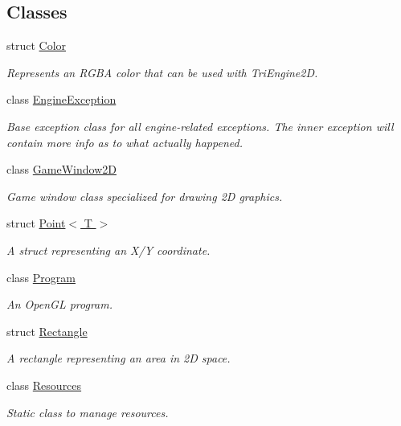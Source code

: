 \subsection*{Classes}
\begin{DoxyCompactItemize}
\item 
struct \hyperlink{struct_tri_devs_1_1_tri_engine_1_1_color}{Color}
\begin{DoxyCompactList}\small\item\em Represents an R\-G\-B\-A color that can be used with Tri\-Engine2\-D. \end{DoxyCompactList}\item 
class \hyperlink{class_tri_devs_1_1_tri_engine_1_1_engine_exception}{Engine\-Exception}
\begin{DoxyCompactList}\small\item\em Base exception class for all engine-\/related exceptions. The inner exception will contain more info as to what actually happened. \end{DoxyCompactList}\item 
class \hyperlink{class_tri_devs_1_1_tri_engine_1_1_game_window2_d}{Game\-Window2\-D}
\begin{DoxyCompactList}\small\item\em Game window class specialized for drawing 2\-D graphics. \end{DoxyCompactList}\item 
struct \hyperlink{struct_tri_devs_1_1_tri_engine_1_1_point_3_01_t_01_4}{Point$<$ T $>$}
\begin{DoxyCompactList}\small\item\em A struct representing an X/\-Y coordinate. \end{DoxyCompactList}\item 
class \hyperlink{class_tri_devs_1_1_tri_engine_1_1_program}{Program}
\begin{DoxyCompactList}\small\item\em An Open\-G\-L program. \end{DoxyCompactList}\item 
struct \hyperlink{struct_tri_devs_1_1_tri_engine_1_1_rectangle}{Rectangle}
\begin{DoxyCompactList}\small\item\em A rectangle representing an area in 2\-D space. \end{DoxyCompactList}\item 
class \hyperlink{class_tri_devs_1_1_tri_engine_1_1_resources}{Resources}
\begin{DoxyCompactList}\small\item\em Static class to manage resources. \end{DoxyCompactList}\item 

\end{DoxyCompactItemize}
